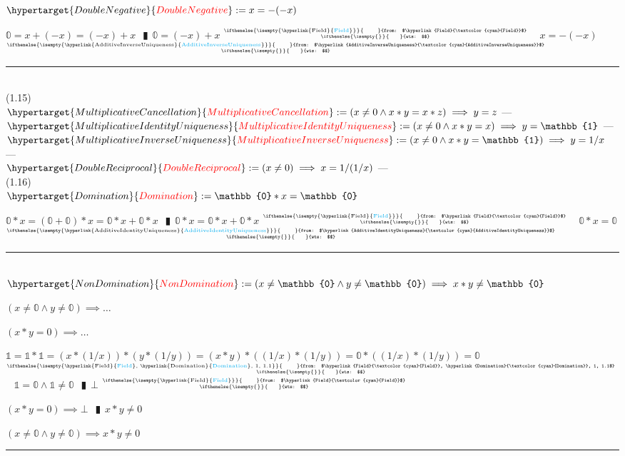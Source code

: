 \documentclass{book}
\newcommand{\df}[1]{\hypertarget{#1}{\textcolor{red}{#1}}}
\newcommand{\rf}[1]{\hyperlink{#1}{\textcolor{cyan}{#1}}}
\newcommand{\abr}{:=}
\newcommand{\pipe}{$\phantom{(}\vrectangleblack\phantom{)}$}
\newcommand{\pr}[1]{\left(#1\right)}
\newcommand{\ann}[2]{%
  \hfill %
  $\stackrel%
  {\hbox{\tiny{\ifthenelse{\isempty{#1}}%
    {\phantom{from}}%
    {from: $#1$}}}}%
  {\hbox{\tiny{\ifthenelse{\isempty{#2}}%
    {\phantom{wts}}%
    {wts: $#2$}}}}$%
\ }
\begin{document}
$\df{DoubleNegative} \abr x = -(-x)$
\begin{enumerate}
  \lit $\mathbb{0} = x + (-x) = (-x) + x$ \pipe $\mathbb{0} = (-x) + x$    \ann{\rf{Field}}{}
  \lit $x = -(-x)$    \ann{\rf{AdditiveInverseUniqueness}}{}
\end{enumerate} \vspace{.75mm} \hrule \vspace{.75mm} \ \\

(1.15) \\
$\df{MultiplicativeCancellation} \abr (x \neq 0 \land x * y = x * z) \implies y = z$    \phantom{TODO}--- \\
$\df{MultiplicativeIdentityUniqueness} \abr (x \neq 0 \land x * y = x) \implies y = \mathbb{1}$    \phantom{TODO}--- \\
$\df{MultiplicativeInverseUniqueness} \abr (x \neq 0 \land x * y = \mathbb{1}) \implies y = 1/x$    \phantom{TODO}--- \\
$\df{DoubleReciprocal} \abr (x \neq 0) \implies x = 1/(1/x)$    \phantom{TODO}--- \\

(1.16) \\
$\df{Domination} \abr \mathbb{0} * x = \mathbb{0}$
\begin{enumerate}
  \lit $\mathbb{0} * x = (\mathbb{0} + \mathbb{0}) * x = \mathbb{0} * x + \mathbb{0} * x$ \pipe $\mathbb{0} * x =  \mathbb{0} * x + \mathbb{0} * x$    \ann{\rf{Field}}{}
  \lit $\mathbb{0} * x = \mathbb{0}$    \ann{\rf{AdditiveIdentityUniqueness}}{}
\end{enumerate} \vspace{.75mm} \hrule \vspace{.75mm} \ \\

$\df{NonDomination} \abr (x \neq \mathbb{0} \land y \neq \mathbb{0}) \implies x * y \neq \mathbb{0}$
\begin{enumerate}
  \lit $(x \neq \mathbb{0} \land y \neq \mathbb{0}) \implies \ldots$
  \begin{enumerate}
    \lit $(x * y = 0) \implies \ldots$
    \begin{enumerate}
      \lit $\mathbb{1} = \mathbb{1} * \mathbb{1} = \pr{x * (1/x)} * \pr{y * (1/y)} = (x * y) * \pr{(1/x) * (1/y)} = \mathbb{0} * \pr{(1/x) * (1/y)} = \mathbb{0}$    \ann{\rf{Field}, \rf{Domination}, 1, 1.1}{}
      \lit $\mathbb{1} = \mathbb{0} \land \mathbb{1} \neq \mathbb{0}$ \pipe $\bot$    \ann{\rf{Field}}{}
    \end{enumerate}
  \lit $(x * y = 0) \implies \bot$ \pipe $x * y \neq 0$
  \end{enumerate}
  \lit $(x \neq \mathbb{0} \land y \neq \mathbb{0}) \implies x * y \neq 0$
\end{enumerate} \vspace{.75mm} \hrule \vspace{.75mm} \ \\
\end{document}
